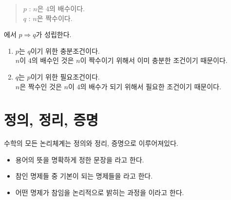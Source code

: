 \documentclass{oblivoir}
\begin{document}
%
\rema{}
\begin{quote}
\(p\) : \(n\)은 \(4\)의 배수이다.\\
\(q\) : \(n\)은 짝수이다.
\end{quote}
에서 \(p\Longrightarrow q\)가 성립한다.
\begin{enumerate}
\item
\(p\)는 \(q\)이기 위한 충분조건이다.\\
\(n\)이 \(4\)의 배수인 것은 \(n\)이 짝수이기 위해서 이미 충분한 조건이기 때문이다.
\item
\(q\)는 \(p\)이기 위한 필요조건이다.\\
\(n\)은 짝수인 것은 \(n\)이 \(4\)의 배수가 되기 위해서 필요한 조건이기 때문이다.
\end{enumerate}

%


\section{정의, 정리, 증명}
수학의 모든 논리체계는 정의와 정리, 증명으로 이루어져있다.
\begin{itemize}
\item
용어의 뜻을 명확하게 정한 문장을 라고 한다.
\item
참인 명제들 중 기본이 되는 명제들을 라고 한다.
\item
어떤 명제가 참임을 논리적으로 밝히는 과정을 이라고 한다.
\end{itemize}
\end{document}
